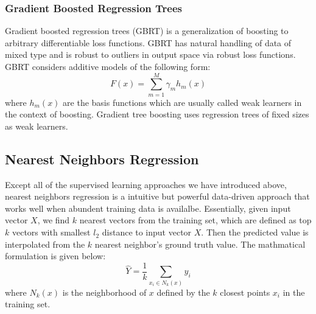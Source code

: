 \subsubsection{Gradient Boosted Regression Trees}
\label{ssub:gradient_boost}
Gradient boosted regression trees (GBRT) is a generalization of boosting to arbitrary differentiable loss functions.
GBRT has natural handling of data of mixed type and is robust to outliers in output space via robust loss functions.
GBRT considers additive models of the following form:
\begin{equation}
	F(x) = \sum\limits_{m=1}^{M} \gamma_m h_m(x)
\end{equation}
where $h_m(x)$ are the basis functions which are usually called weak learners in the context of boosting.
Gradient tree boosting uses regression trees of fixed sizes as weak learners.

\subsection{Nearest Neighbors Regression}
\label{sub:nearest_neighbor}
Except all of the supervised learning approaches we have introduced above, nearest neighbors regression is a intuitive but powerful data-driven approach that works well when abundent training data is availalbe.
Essentially, given input vector $X$, we find $k$ nearest vectors from the training set, which are defined as top $k$ vectors with smallest $l_2$ distance to input vector $X$.
Then the predicted value is interpolated from the $k$ nearest neighbor's ground truth value. 
The mathmatical formulation is given below:
\begin{equation}
	\hat{Y} = \frac{1}{k} \sum \limits_{x_i \in N_k(x)} y_i
\end{equation}
where $N_k(x)$ is the neighborhood of $x$ defined by the $k$ closest points $x_i$ in the training set.

